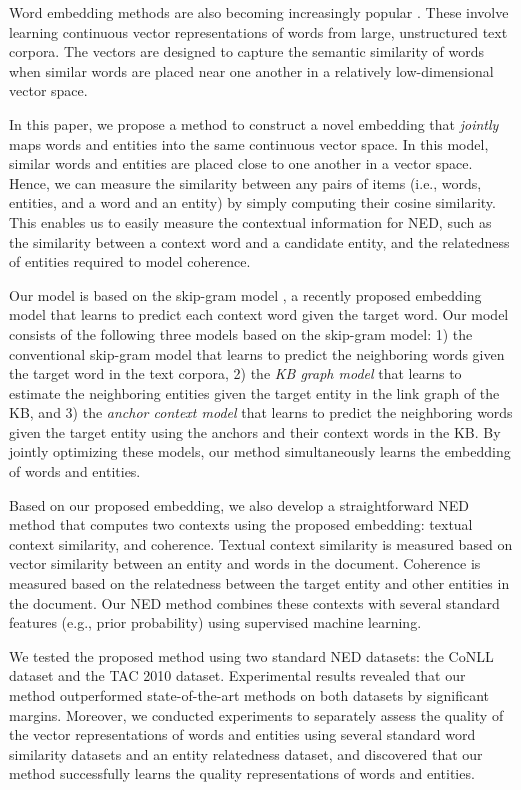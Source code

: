 \documentclass[11pt,letterpaper]{article}
\begin{document}
Word embedding methods are also becoming increasingly popular \cite{Mikolov2013,Mikolov2013a,Pennington2014}.
These involve learning continuous vector representations of words from large, unstructured text corpora.
The vectors are designed to capture the semantic similarity of words when similar words are placed near one another in a relatively low-dimensional vector space.

In this paper, we propose a method to construct a novel embedding that \textit{jointly} maps words and entities into the same continuous vector space.
In this model, similar words and entities are placed close to one another in a vector space.
Hence, we can measure the similarity between any pairs of items (i.e., words, entities, and a word and an entity) by simply computing their cosine similarity.
This enables us to easily measure the contextual information for NED, such as the similarity between a context word and a candidate entity, and the relatedness of entities required to model coherence.

Our model is based on the skip-gram model \cite{Mikolov2013,Mikolov2013a}, a recently proposed embedding model that learns to predict each context word given the target word.
Our model consists of the following three models based on the skip-gram model:
1) the conventional skip-gram model that learns to predict the neighboring words given the target word in the text corpora,
2) the \textit{KB graph model} that learns to estimate the neighboring entities given the target entity in the link graph of the KB,
and 3) the \textit{anchor context model} that learns to predict the neighboring words given the target entity using the anchors and their context words in the KB.
By jointly optimizing these models, our method simultaneously learns the embedding of words and entities.

Based on our proposed embedding, we also develop a straightforward NED method that computes two contexts using the proposed embedding: textual context similarity, and coherence.
Textual context similarity is measured based on vector similarity between an entity and words in the document.
Coherence is measured based on the relatedness between the target entity and other entities in the document.
Our NED method combines these contexts with several standard features (e.g., prior probability) using supervised machine learning.

We tested the proposed method using two standard NED datasets: the CoNLL dataset and the TAC 2010 dataset.
Experimental results revealed that our method outperformed state-of-the-art methods on both datasets by significant margins.
Moreover, we conducted experiments to separately assess the quality of the vector representations of words and entities using several standard word similarity datasets and an entity relatedness dataset, and discovered that our method successfully learns the quality representations of words and entities.
\end{document}
